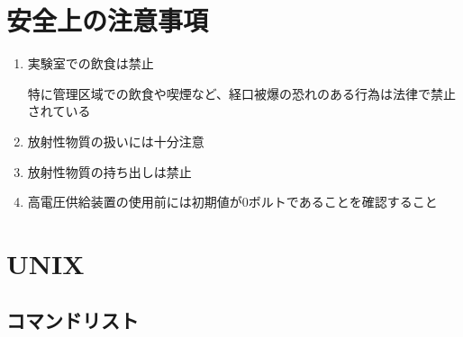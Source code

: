 \documentclass{jarticle}
\begin{document}
 \section{安全上の注意事項}
 	  \begin{enumerate}
	   \item 実験室での飲食は禁止
		 
		 特に管理区域での飲食や喫煙など、経口被爆の恐れのある行為は法律で禁止されている
		 
	   \item 放射性物質の扱いには十分注意

	   \item 放射性物質の持ち出しは禁止

	   \item 高電圧供給装置の使用前には初期値が0ボルトであることを確認すること
		 
		
	  \end{enumerate}
	  

	  
	  
	  
\clearpage

\appendix 
	  
	  
 \section{UNIX}
	  
  \subsection*{コマンドリスト}
	  
\end{document}
